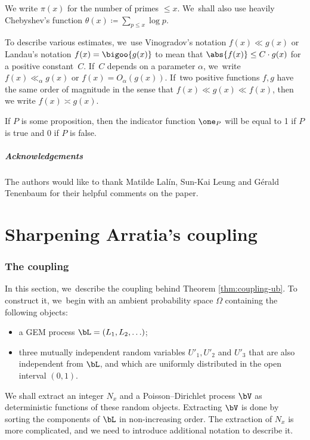 We write $\pi(x)$ for the number of primes $\le x$. We~shall also use heavily Chebyshev's function $\theta(x) \coloneqq \sum_{p\le x}\log p$.

To describe various estimates, we~use Vinogradov's notation $f(x) \ll g(x)$ or Landau's notation $f(x) = \bigoo{g(x)}$ to mean that $\abs{f(x)} \le C\cdot g(x)$ for a positive constant~$C$. If~$C$ depends on a parameter $\alpha$, we~write $f(x) \ll_\alpha g(x)$ or $f(x) = O_\alpha(g(x))$. If~two positive functions $f, g$ have the same order of magnitude in the sense that $f(x) \ll g(x) \ll f(x)$, then we write $f(x) \asymp g(x)$.

If $P$ is some proposition, then the indicator function $\one _P$ will be equal to 1 if $P$ is true and $0$ if $P$ is false.

\subsubsection*{Acknowledgements}
The authors would like to thank Matilde Lalín, Sun-Kai Leung and Gérald Tenenbaum for their helpful comments on the paper.

\part{Sharpening Arratia's coupling}\label{part:Arratia}

\section{The coupling}
\label{sec:coupling}

In this section, we~describe the coupling behind Theorem \ref{thm:coupling-ub}. To construct it, we~begin with an ambient probability space $\Omega$ containing the following objects:
\begin{itemize}
\item a GEM process $\bL = (L_1, L_2, \ldots)$;

\item three mutually independent random variables $U'_1, U'_2$ and $U'_3$ that are also independent from $\bL$, and which are uniformly distributed in the open interval $(0, 1)$.
\end{itemize}
We shall extract an integer $N_x$ and a Poisson--Dirichlet process $\bV$ as deterministic functions of these random objects. Extracting $\bV$ is done by sorting the components of $\bL$ in non-increasing order. The extraction of $N_x$ is more complicated, and we need to introduce additional notation to describe it.

